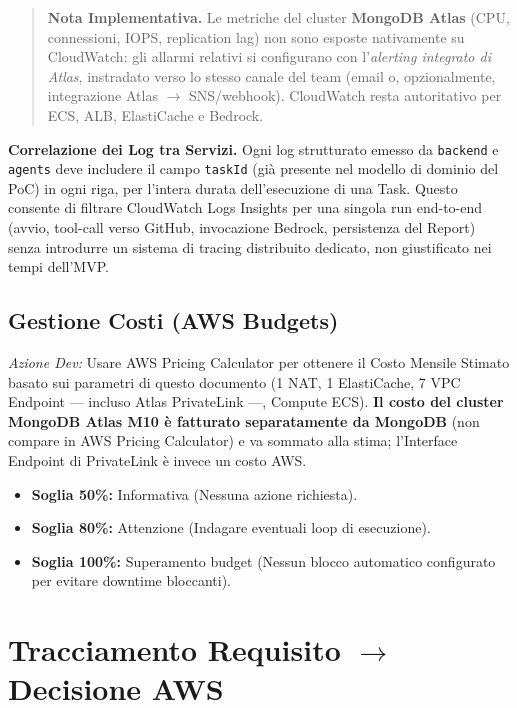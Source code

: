 \documentclass[11pt,a4paper]{article}
\begin{document}
\begin{quote}
\textbf{Nota Implementativa.} Le metriche del cluster \textbf{MongoDB Atlas} (CPU, connessioni, IOPS, replication lag) non sono esposte nativamente su CloudWatch: gli allarmi relativi si configurano con l'\emph{alerting integrato di Atlas}, instradato verso lo stesso canale del team (email o, opzionalmente, integrazione Atlas $\to$ SNS/webhook). CloudWatch resta autoritativo per ECS, ALB, ElastiCache e Bedrock.
\end{quote}

\textbf{Correlazione dei Log tra Servizi.} Ogni log strutturato emesso da \texttt{backend} e \texttt{agents} deve includere il campo \texttt{taskId} (già presente nel modello di dominio del PoC) in ogni riga, per l'intera durata dell'esecuzione di una Task. Questo consente di filtrare CloudWatch Logs Insights per una singola run end-to-end (avvio, tool-call verso GitHub, invocazione Bedrock, persistenza del Report) senza introdurre un sistema di tracing distribuito dedicato, non giustificato nei tempi dell'MVP.

\subsection{Gestione Costi (AWS Budgets)}

\emph{Azione Dev:} Usare AWS Pricing Calculator per ottenere il Costo Mensile Stimato basato sui parametri di questo documento (1 NAT, 1 ElastiCache, 7 VPC Endpoint --- incluso Atlas PrivateLink ---, Compute ECS). \textbf{Il costo del cluster MongoDB Atlas M10 è fatturato separatamente da MongoDB} (non compare in AWS Pricing Calculator) e va sommato alla stima; l'Interface Endpoint di PrivateLink è invece un costo AWS.

\begin{itemize}
    \item \textbf{Soglia 50\%:} Informativa (Nessuna azione richiesta).
    \item \textbf{Soglia 80\%:} Attenzione (Indagare eventuali loop di esecuzione).
    \item \textbf{Soglia 100\%:} Superamento budget (Nessun blocco automatico configurato per evitare downtime bloccanti).
\end{itemize}

\section{Tracciamento Requisito $\to$ Decisione AWS}
\end{document}
